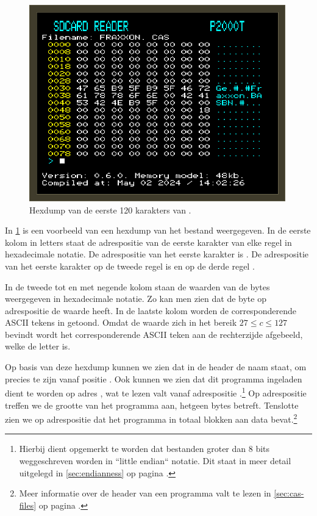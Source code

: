 \begin{figure}[h!]
    \centering
    \includegraphics[width=0.99\textwidth]{img/hexdump-fraxxon.png}
    \caption{Hexdump van de eerste 120 karakters van .}
    \label{fig:screenshot-hexdump-fraxxon}
\end{figure}

In \cref{fig:screenshot-hexdump-fraxxon} is een voorbeeld van een hexdump van het bestand  weergegeven. In de eerste kolom in  letters staat de adrespositie van de eerste karakter van elke regel in hexadecimale notatie. De adrespositie van het eerste karakter is . De adrespositie van het eerste karakter op de tweede regel is  en op de derde regel .

In de tweede tot en met negende kolom staan de waarden van de bytes weergegeven in hexadecimale notatie. Zo kan men zien dat de byte op adrespositie  de waarde  heeft. In de laatste kolom worden de corresponderende ASCII tekens in  getoond. Omdat de waarde  zich in het bereik $27 \leq c \leq 127$ bevindt wordt het corresponderende ASCII teken aan de rechterzijde afgebeeld, welke de letter  is.

Op basis van deze hexdump kunnen we zien dat in de header de naam  staat, om precies te zijn vanaf positie . Ook kunnen we zien dat dit programma ingeladen dient te worden op adres , wat te lezen valt vanaf adrespositie .\footnote{Hierbij dient opgemerkt te worden dat bestanden groter dan 8 bits weggeschreven worden in ``little endian`` notatie. Dit staat in meer detail uitgelegd in \cref{sec:endianness} op pagina \pageref{sec:endianness}.} Op adrespositie  treffen we de grootte van het programma aan, hetgeen  bytes betreft. Tenslotte zien we op adrespositie  dat het programma in totaal  blokken aan data bevat.\footnote{Meer informatie over de header van een \cas programma valt te lezen in \cref{sec:cas-files} op pagina \pageref{sec:cas-files}.}

